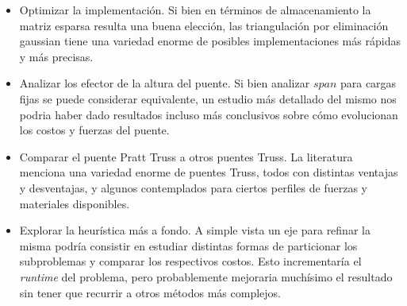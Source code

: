 \begin{itemize}
\item Optimizar la implementación. Si bien en términos de almacenamiento la matriz esparsa resulta una buena elección, las triangulación por eliminación gaussian tiene una variedad enorme de posibles implementaciones más rápidas y más precisas.
\item Analizar los efector de la altura del puente. Si bien analizar $span$ para cargas fijas se puede considerar equivalente, un estudio más detallado del mismo nos podria haber dado resultados incluso más conclusivos sobre cómo evolucionan los costos y fuerzas del puente.
\item Comparar el puente Pratt Truss a otros puentes Truss. La literatura menciona una variedad enorme de puentes Truss, todos con distintas ventajas y desventajas, y algunos contemplados para ciertos perfiles de fuerzas y materiales disponibles.
\item Explorar la heurística más a fondo. A simple vista un eje para refinar la misma podría consistir en estudiar distintas formas de particionar los subproblemas y comparar los respectivos costos. Esto incrementaría el \textit{runtime} del problema, pero probablemente mejoraria muchísimo el resultado sin tener que recurrir a otros métodos más complejos.
\end{itemize}
